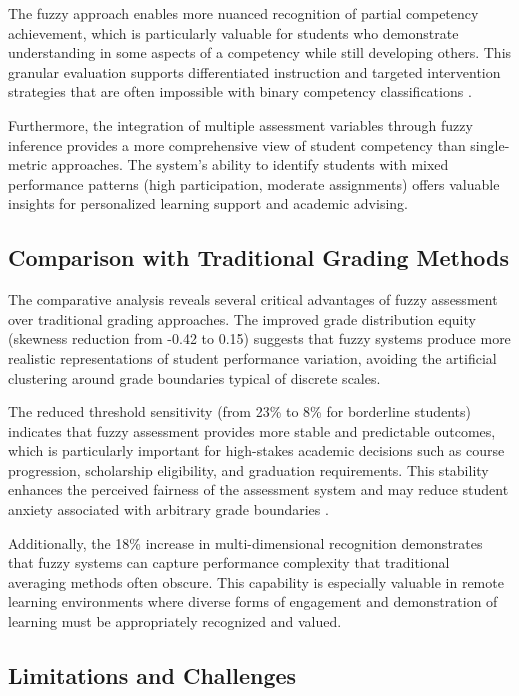 The fuzzy approach enables more nuanced recognition of partial competency achievement, which is particularly valuable for students who demonstrate understanding in some aspects of a competency while still developing others. This granular evaluation supports differentiated instruction and targeted intervention strategies that are often impossible with binary competency classifications \cite{Martinez2024, Brown2024}.

Furthermore, the integration of multiple assessment variables through fuzzy inference provides a more comprehensive view of student competency than single-metric approaches. The system's ability to identify students with mixed performance patterns (high participation, moderate assignments) offers valuable insights for personalized learning support and academic advising.

\subsection{Comparison with Traditional Grading Methods}

The comparative analysis reveals several critical advantages of fuzzy assessment over traditional grading approaches. The improved grade distribution equity (skewness reduction from -0.42 to 0.15) suggests that fuzzy systems produce more realistic representations of student performance variation, avoiding the artificial clustering around grade boundaries typical of discrete scales.

The reduced threshold sensitivity (from 23\% to 8\% for borderline students) indicates that fuzzy assessment provides more stable and predictable outcomes, which is particularly important for high-stakes academic decisions such as course progression, scholarship eligibility, and graduation requirements. This stability enhances the perceived fairness of the assessment system and may reduce student anxiety associated with arbitrary grade boundaries \cite{Wilson2024}.

Additionally, the 18\% increase in multi-dimensional recognition demonstrates that fuzzy systems can capture performance complexity that traditional averaging methods often obscure. This capability is especially valuable in remote learning environments where diverse forms of engagement and demonstration of learning must be appropriately recognized and valued.

\subsection{Limitations and Challenges}


